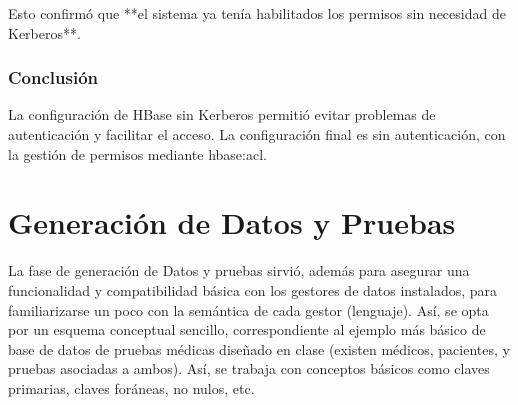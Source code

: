 \documentclass{article}
\begin{document}
Esto confirmó que **el sistema ya tenía habilitados los permisos sin necesidad de Kerberos**.


\subsubsection{Conclusión}
La configuración de HBase sin Kerberos permitió evitar problemas de autenticación y facilitar el acceso. La configuración final es sin autenticación, con la gestión de permisos mediante hbase:acl.

\section{Generación de Datos y Pruebas}
La fase de generación de Datos y pruebas sirvió, además para asegurar una funcionalidad y compatibilidad básica con los gestores de datos instalados, para familiarizarse un poco con la semántica de cada gestor (lenguaje). 
Así, se opta por un esquema conceptual sencillo, correspondiente al ejemplo más básico de base de datos de pruebas médicas diseñado en clase (existen médicos, pacientes, y pruebas asociadas a ambos). Así, se trabaja con conceptos básicos como claves primarias, claves foráneas, no nulos, etc.
\end{document}
